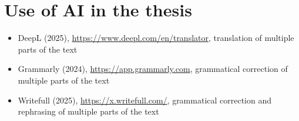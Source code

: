 \setcounter{figure}{0}
\setcounter{table}{0}
\setcounter{section}{0}
\setcounter{listing}{0}

\chapter{Use of AI in the thesis \label{cha:ai-use}}
\renewcommand{\thepage}{C-\arabic{page}}

\begin{itemize}
    \item DeepL (2025), \url{https://www.deepl.com/en/translator}, translation of multiple parts of the text
    \item Grammarly (2024), \url{https://app.grammarly.com}, grammatical correction of multiple parts of the text
    \item Writefull (2025), \url{https://x.writefull.com/}, grammatical correction and rephrasing of multiple parts of the text
\end{itemize}
